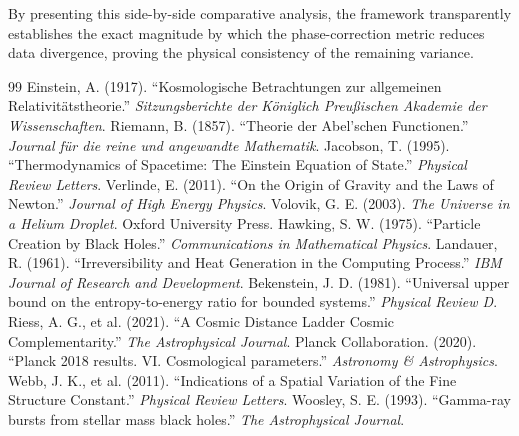 \documentclass[11pt,a4paper]{article}
\theoremstyle{plain}
\theoremstyle{definition}
\theoremstyle{remark}
\begin{document}
By presenting this side-by-side comparative analysis, the framework transparently establishes the exact magnitude by which the phase-correction metric reduces data divergence, proving the physical consistency of the remaining variance.
\newpage
\begin{thebibliography}{99}
 Einstein, A. (1917). ``Kosmologische Betrachtungen zur allgemeinen Relativitätstheorie.'' \textit{Sitzungsberichte der Königlich Preußischen Akademie der Wissenschaften}.
 Riemann, B. (1857). ``Theorie der Abel'schen Functionen.'' \textit{Journal für die reine und angewandte Mathematik}.
 Jacobson, T. (1995). ``Thermodynamics of Spacetime: The Einstein Equation of State.'' \textit{Physical Review Letters}.
 Verlinde, E. (2011). ``On the Origin of Gravity and the Laws of Newton.'' \textit{Journal of High Energy Physics}.
 Volovik, G. E. (2003). \textit{The Universe in a Helium Droplet}. Oxford University Press.
 Hawking, S. W. (1975). ``Particle Creation by Black Holes.'' \textit{Communications in Mathematical Physics}.
 Landauer, R. (1961). ``Irreversibility and Heat Generation in the Computing Process.'' \textit{IBM Journal of Research and Development}.
 Bekenstein, J. D. (1981). ``Universal upper bound on the entropy-to-energy ratio for bounded systems.'' \textit{Physical Review D}.
 Riess, A. G., et al. (2021). ``A Cosmic Distance Ladder Cosmic Complementarity.'' \textit{The Astrophysical Journal}.
 Planck Collaboration. (2020). ``Planck 2018 results. VI. Cosmological parameters.'' \textit{Astronomy \& Astrophysics}.
 Webb, J. K., et al. (2011). ``Indications of a Spatial Variation of the Fine Structure Constant.'' \textit{Physical Review Letters}.
 Woosley, S. E. (1993). ``Gamma-ray bursts from stellar mass black holes.'' \textit{The Astrophysical Journal}.
\end{thebibliography}
\end{document}

